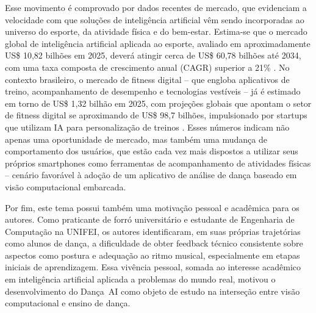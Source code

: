 Esse movimento é comprovado por dados recentes de mercado, que evidenciam a velocidade com que soluções de inteligência artificial vêm sendo incorporadas ao universo do esporte, da atividade física e do bem-estar. Estima-se que o mercado global de inteligência artificial aplicada ao esporte, avaliado em aproximadamente US\$ 10,82 bilhões em 2025, deverá atingir cerca de US\$ 60,78 bilhões até 2034, com uma taxa composta de crescimento anual (CAGR) superior a 21\% \cite{precedence2025aisports}. No contexto brasileiro, o mercado de fitness digital -- que engloba aplicativos de treino, acompanhamento de desempenho e tecnologias vestíveis -- já é estimado em torno de US\$ 1,32 bilhão em 2025, com projeções globais que apontam o setor de fitness digital se aproximando de US\$ 98,7 bilhões, impulsionado por startups que utilizam IA para personalização de treinos \cite{saudedigital2025fitness}. Esses números indicam não apenas uma oportunidade de mercado, mas também uma mudança de comportamento dos usuários, que estão cada vez mais dispostos a utilizar seus próprios smartphones como ferramentas de acompanhamento de atividades físicas -- cenário favorável à adoção de um aplicativo de análise de dança baseado em visão computacional embarcada.

Por fim, este tema possui também uma motivação pessoal e acadêmica para os autores. Como praticante de forró universitário e estudante de Engenharia de Computação na UNIFEI, os autores identificaram, em suas próprias trajetórias como alunos de dança, a dificuldade de obter feedback técnico consistente sobre aspectos como postura e adequação ao ritmo musical, especialmente em etapas iniciais de aprendizagem. Essa vivência pessoal, somada ao interesse acadêmico em inteligência artificial aplicada a problemas do mundo real, motivou o desenvolvimento do Dança~AI como objeto de estudo na interseção entre visão computacional e ensino de dança.